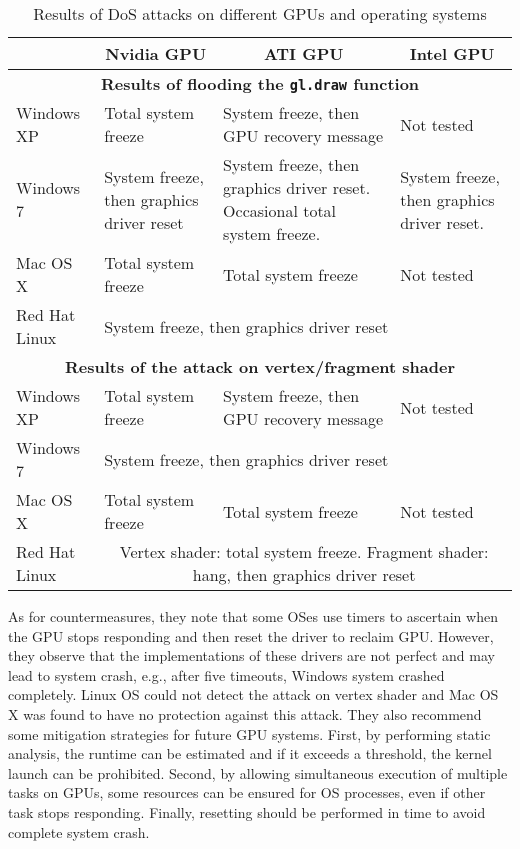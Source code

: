 \begin{table}[htbp]
\centering
\caption{Results of DoS attacks on different GPUs and operating systems \cite{patterson2013vulnerability}}
\begin{tabular}{ |l|p{4cm}|p{5.5cm}|p{4cm}| } \hline
  & \multicolumn{1}{c}{Nvidia GPU} &  \multicolumn{1}{|c}{ATI GPU} &  \multicolumn{1}{|c|}{Intel GPU} \\
 \hline

 \multicolumn{4}{|c|}{\textbf{Results of flooding the  {\tt gl.draw} function}} \\\hline

 Windows XP &  Total system freeze & System freeze, then GPU recovery message & Not tested\\
 \hline
 Windows 7 & System freeze, then graphics driver reset & System freeze, then graphics driver reset. Occasional total system freeze. & System freeze, then graphics driver reset.\\
 \hline
 Mac OS X & Total system freeze & Total system freeze & Not tested\\
 \hline
  Red Hat Linux & \multicolumn{3}{G|}{System freeze, then graphics driver reset} \\\hline
\multicolumn{4}{|c|}{\textbf{Results of the attack on vertex/fragment shader}} \\\hline
 Windows XP &  Total system freeze & System freeze, then GPU recovery message & Not tested\\
  \hline  
Windows 7 & \multicolumn{3}{G|}{System freeze, then graphics driver reset} \\
    \hline
 Mac OS X & Total system freeze & Total system freeze & Not tested\\
 \hline
 Red Hat Linux & \multicolumn{3}{c|}{Vertex shader: total system freeze. Fragment shader:  hang, then graphics driver reset}  \\
 \hline

\end{tabular}
\label{Table:DoSAttacks}
\end{table}


As for countermeasures, they note that some OSes use timers to ascertain  when the GPU stops responding and then reset the driver to reclaim GPU. However, they observe that the implementations of these drivers are not perfect and may lead to system crash, e.g., after five timeouts, Windows system crashed completely. Linux OS could not detect the attack on vertex shader and Mac OS X was found to have no protection against this attack.  They also recommend some mitigation strategies for future GPU systems. First, by performing static analysis, the runtime can be estimated and if it exceeds a threshold, the kernel launch can be prohibited. Second, by allowing simultaneous execution of multiple tasks on GPUs, some resources can be ensured for OS processes, even if other task stops responding. Finally, resetting should be performed in time to avoid complete system crash.
 

  

